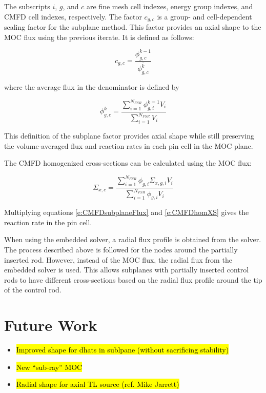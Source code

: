 The subscripts $i$, $g$, and $c$ are fine mesh cell indexes, energy group indexes, and CMFD cell indexes, respectively.  The factor $c_{g,c}$ is a group- and cell-dependent scaling factor for the subplane method.  This factor provides an axial shape to the MOC flux using the previous iterate.  It is defined as follows:

\begin{equation}\label{e:CMFDsubplaneFactor}
c_{g,c} = \frac{\phi^{k-1}_{g,c}}{\overline{\phi^k_{g,c}}}
\end{equation}

where the average flux in the denominator is defined by

\begin{equation}\label{e:CMFDaverageFlux}
\phi^k_{g,c} = \frac{\sum_{i=1}^{N_{FSR}} \phi^{k=1}_{g,i} V_i}{\sum_{i=1}^{N_{FSR}} V_i}
\end{equation}

This definition of the subplane factor provides axial shape while still preserving the volume-averaged flux and reaction rates in each pin cell in the MOC plane.

The CMFD homogenized cross-sections can be calculated using the MOC flux:

\begin{equation}\label{e:CMFDhomXS}
\Sigma_{x,c} = \frac{\sum_{i=1}^{N_{FSR}} \phi_{g,i}\Sigma_{x,g,i}V_i}{\sum_{i=1}^{N_{FSR}} \phi_{g,i}V_i}
\end{equation}

Multiplying equations \ref{e:CMFDsubplaneFlux} and \ref{e:CMFDhomXS} gives the reaction rate in the pin cell.

When using the embedded solver, a radial flux profile is obtained from the solver.  The process described above is followed for the nodes around the partially inserted rod.  However, instead of the MOC flux, the radial flux from the embedded solver is used.  This allows subplanes with partially inserted control rods to have different cross-sections based on the radial flux profile around the tip of the control rod.


\section{Future Work}

\begin{itemize}
\item \hl{Improved shape for dhats in sublpane (without sacrificing stability)}
\item \hl{New ``sub-ray'' MOC}
\item \hl{Radial shape for axial TL source (ref. Mike Jarrett)}
\end{itemize}